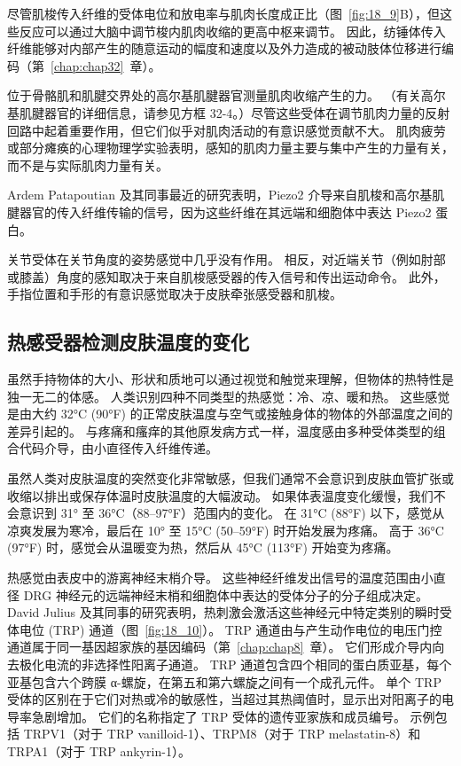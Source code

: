 尽管肌梭传入纤维的受体电位和放电率与肌肉长度成正比（图~\ref{fig:18_9}B），但这些反应可以通过大脑中调节梭内肌肉收缩的更高中枢来调节。
因此，纺锤体传入纤维能够对内部产生的随意运动的幅度和速度以及外力造成的被动肢体位移进行编码（第~\ref{chap:chap32}~章）。


位于骨骼肌和肌腱交界处的高尔基肌腱器官测量肌肉收缩产生的力。
（有关高尔基肌腱器官的详细信息，请参见方框 32-4。）尽管这些受体在调节肌肉力量的反射回路中起着重要作用，但它们似乎对肌肉活动的有意识感觉贡献不大。
肌肉疲劳或部分瘫痪的心理物理学实验表明，感知的肌肉力量主要与集中产生的力量有关，而不是与实际肌肉力量有关。


Ardem Patapoutian 及其同事最近的研究表明，Piezo2 介导来自肌梭和高尔基肌腱器官的传入纤维传输的信号，因为这些纤维在其远端和细胞体中表达 Piezo2 蛋白。


关节受体在关节角度的姿势感觉中几乎没有作用。
相反，对近端关节（例如肘部或膝盖）角度的感知取决于来自肌梭感受器的传入信号和传出运动命令。
此外，手指位置和手形的有意识感觉取决于皮肤牵张感受器和肌梭。



\subsection{热感受器检测皮肤温度的变化}

虽然手持物体的大小、形状和质地可以通过视觉和触觉来理解，但物体的热特性是独一无二的体感。
人类识别四种不同类型的热感觉：冷、凉、暖和热。
这些感觉是由大约 32°C (90°F) 的正常皮肤温度与空气或接触身体的物体的外部温度之间的差异引起的。
与疼痛和瘙痒的其他原发病方式一样，温度感由多种受体类型的组合代码介导，由小直径传入纤维传递。


虽然人类对皮肤温度的突然变化非常敏感，但我们通常不会意识到皮肤血管扩张或收缩以排出或保存体温时皮肤温度的大幅波动。
如果体表温度变化缓慢，我们不会意识到 31° 至 36°C（88–97°F）范围内的变化。
在 31°C (88°F) 以下，感觉从凉爽发展为寒冷，最后在 10° 至 15°C (50–59°F) 时开始发展为疼痛。
高于 36°C (97°F) 时，感觉会从温暖变为热，然后从 45°C (113°F) 开始变为疼痛。


热感觉由表皮中的游离神经末梢介导。
这些神经纤维发出信号的温度范围由小直径 DRG 神经元的远端神经末梢和细胞体中表达的受体分子的分子组成决定。
David Julius 及其同事的研究表明，热刺激会激活这些神经元中特定类别的瞬时受体电位 (TRP) 通道（图~\ref{fig:18_10}）。
TRP 通道由与产生动作电位的电压门控通道属于同一基因超家族的基因编码（第~\ref{chap:chap8}~章）。 
它们形成介导内向去极化电流的非选择性阳离子通道。
TRP 通道包含四个相同的蛋白质亚基，每个亚基包含六个跨膜 α-螺旋，在第五和第六螺旋之间有一个成孔元件。
单个 TRP 受体的区别在于它们对热或冷的敏感性，当超过其热阈值时，显示出对阳离子的电导率急剧增加。
它们的名称指定了 TRP 受体的遗传亚家族和成员编号。 
示例包括 TRPV1（对于 TRP vanilloid-1）、TRPM8（对于 TRP melastatin-8）和 TRPA1（对于 TRP ankyrin-1）。



